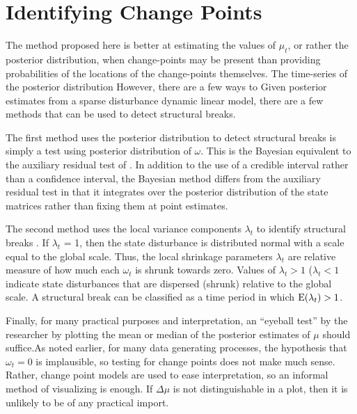 \section{Identifying Change Points}
\label{dlm:sec:ident-change-points}

The method proposed here is better at estimating the values of $\mu_{t}$, or rather the posterior distribution, when change-points may be present than providing probabilities of the locations of the change-points themselves.
The time-series of the posterior distribution 
However, there are a few ways to Given posterior estimates from a sparse disturbance dynamic linear model, there are a few methods that
can be used to detect structural breaks.

The first method uses the posterior distribution to detect structural breaks is simply a test using posterior distribution of $\omega$.
This is the Bayesian equivalent to the auxiliary residual test of \textcite{DeJongPenzer1998}.
In addition to the use of a credible interval rather than a confidence interval, the Bayesian method differs from the auxiliary residual test in that it integrates over the posterior distribution of the state matrices rather than fixing them at point estimates.

The second method uses the local variance components $\lambda_{t}$ to identify structural breaks \parencite[179-180]{PetrisPetroneEtAl2009}.
If $\lambda_{t}$ = 1, then the state disturbance is distributed normal with a scale equal to the global scale.
Thus, the local shrinkage parameters $\lambda_{t}$ are relative measure of how much each $\omega_{t}$ is shrunk towards zero.
Values of $\lambda_{t} > 1$ ($\lambda_{t} < 1$ indicate state disturbances that are dispersed (shrunk) relative to the global scale.
A structural break can be classified as a time period in which $\operatorname{E}(\lambda_{t}) > 1$.


Finally, for many practical purposes and interpretation, an ``eyeball test'' by the researcher by plotting the mean or median of the posterior estimates of $\mu$ should suffice.As noted earlier, for many data generating processes, the hypothesis that $\omega_{t} = 0$ is implausible, so testing for change points does not make much sense.
Rather, change point models are used to ease interpretation, so an informal method of visualizing is enough.
If $\Delta \mu$ is not distinguishable in a plot, then it is unlikely to be of any practical import.



